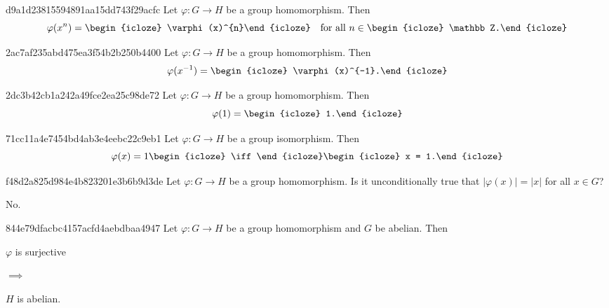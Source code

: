 \begin{note}{d9a1d23815594891aa15dd743f29acfc}
    Let \({ \varphi : G \to H }\) be a group homomorphism.
    Then
    \[
        \varphi(x^{n}) = \begin{icloze}{1}\varphi(x)^{n}\end{icloze} \quad \text{for all } n \in \begin{icloze}{2}\mathbb Z.\end{icloze}
    \]
\end{note}

\begin{note}{2ac7af235abd475ea3f54b2b250b4400}
    Let \({ \varphi : G \to H }\) be a group homomorphism.
    Then
    \[
        \varphi(x^{-1}) = \begin{icloze}{1}\varphi(x)^{-1}.\end{icloze}
    \]
\end{note}

\begin{note}{2dc3b42cb1a242a49fce2ea25c98de72}
    Let \({ \varphi : G \to H }\) be a group homomorphism.
    Then
    \[
        \varphi(1) = \begin{icloze}{1}1.\end{icloze}
    \]
\end{note}

\begin{note}{71cc11a4e7454bd4ab3e4eebc22c9eb1}
    Let \({ \varphi : G \to H }\) be a group isomorphism.
    Then
    \[
        \varphi(x) = 1 \begin{icloze}{2}\iff\end{icloze} \begin{icloze}{1}x = 1.\end{icloze}
    \]
\end{note}

\begin{note}{f48d2a825d984e4b823201e3b6b9d3de}
    Let \({ \varphi : G \to H }\) be a group homomorphism.
    Is it unconditionally true that \({ \left\lvert \varphi(x) \right\rvert = \left\lvert x \right\rvert }\) for all \({ x \in G }\)?

    \begin{cloze}{1}
        No.
    \end{cloze}
\end{note}

\begin{note}{844e79dfacbc4157acfd4aebdbaa4947}
    Let \({ \varphi : G \to H }\) be a group homomorphism and \({ G }\) be abelian.
    Then
    \begin{center}
        \begin{icloze}{1}\({ \varphi }\) is surjective\end{icloze} \begin{icloze}{3}\({ \implies }\)\end{icloze} \begin{icloze}{2}\({ H }\) is abelian.\end{icloze}
    \end{center}
\end{note}


